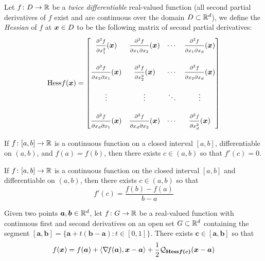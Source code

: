 \begin{example}
Let $f\colon D \to \mathbb{R}$ be a \emph{twice differentiable} real-valued function (all second partial derivatives of $f$ exist and are continuous over the domain $D \subset \mathbb{R}^d$), we define the \emph{Hessian} of $f$ at $\boldsymbol{x} \in D$ to be the following matrix of second partial derivatives:
\begin{equation*}
\mathop{\mathrm{Hess}{f}}(\boldsymbol{x}) = \begin{bmatrix}
\frac{\strut\partial^2 f}{\strut\partial x_1^2}(\boldsymbol{x}) & \frac{\strut\partial^2 f}{\strut\partial x_1 \partial x_2}(\boldsymbol{x}) &\dotsb &\frac{\strut\partial^2 f}{\strut\partial x_1 \partial x_d}(\boldsymbol{x}) \\
&&&\\
\frac{\strut\partial^2 f}{\strut\partial x_2 \partial x_1}(\boldsymbol{x}) & \frac{\strut\partial^2 f}{\strut\partial x_2^2}(\boldsymbol{x}) &\dotsb &\frac{\strut\partial^2 f}{\strut\partial x_2 \partial x_d}(\boldsymbol{x}) \\
&&& \\
\vdots & \vdots &\ddots &\vdots \\
&&& \\
\frac{\strut\partial^2 f}{\strut\partial x_d \partial x_1}(\boldsymbol{x}) & \frac{\strut\partial^2 f}{\strut\partial x_d \partial x_2}(\boldsymbol{x}) &\dotsb &\frac{\strut\partial^2 f}{\strut\partial x_d^2}(\boldsymbol{x})
\end{bmatrix}
\end{equation*}
\end{example}

\begin{theorem}\label{theorem:Rolle}
If $f\colon [a,b] \to \mathbb{R}$ is a continuous function on a closed interval $[a,b]$, differentiable on $(a,b)$, and $f(a) = f(b)$, then there exists $c \in (a,b)$ so that $f'(c)=0$.
\end{theorem}

\begin{theorem}\label{theorem:MVT}
If $f\colon [a,b] \to \mathbb{R}$ is a continuous function on the closed interval $[a,b]$ and differentiable on $(a,b)$, then there exists $c \in (a,b)$ so that
\begin{equation*}
f'(c) = \frac{f(b)-f(a)}{b-a}
\end{equation*}
\end{theorem}

\begin{theorem}[Taylor]\label{theorem:Taylor}
Given two points $\boldsymbol{a}, \boldsymbol{b} \in \mathbb{R}^d$, let $f\colon G \to \mathbb{R}$ be a real-valued function with continuous first and second derivatives on an open set $G \subset \mathbb{R}^d$ containing the segment $[\boldsymbol{a}, \boldsymbol{b}] = \{ \boldsymbol{a} + t (\boldsymbol{b} - \boldsymbol{a}) : t \in [0,1] \}$.  There exists $\boldsymbol{c} \in [\boldsymbol{a}, \boldsymbol{b}]$ so that 
\begin{equation*}
f(\boldsymbol{x}) = f(\boldsymbol{a}) + \langle \mathop{\nabla\! {f}}(\boldsymbol{a}), \boldsymbol{x} - \boldsymbol{a} \rangle + \frac{1}{2} \mathcal{Q}_{\boldsymbol{\mathop{\mathrm{Hess}{f}}(c)}} (\boldsymbol{x}-\boldsymbol{a})
\end{equation*}
\end{theorem}

